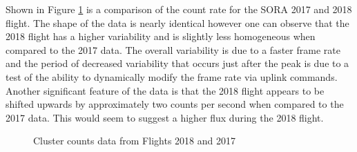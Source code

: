 Shown in Figure \ref{counts} is a comparison of the count rate for the SORA 2017 and 2018 flight. The shape of the data is nearly identical however one can observe that the 2018 flight has a higher variability and is slightly less homogeneous when compared to the 2017 data. The overall variability is due to a faster frame rate and the period of decreased variability that occurs just after the peak is due to a test of the ability to dynamically modify the frame rate via uplink commands. Another significant feature of the data is that the 2018 flight appears to be shifted upwards by approximately two counts per second when compared to the 2017 data. This would seem to suggest a higher flux during the 2018 flight.
\begin{figure}[H]
\hfill
{}
\hfill
{}
\hfill
\caption{Cluster counts data from Flights 2018 and 2017}
\label{counts}
\end{figure}


